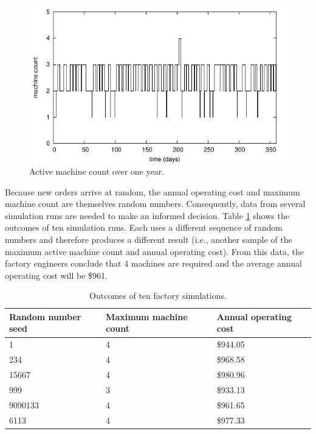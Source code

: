 \begin{figure}[ht]
\centering
\includegraphics{var_struct_models_figs/machine_plot.pdf}
\caption{Active machine count over one year.}
\label{fig:active_machine_plot}
\end{figure}
Because new orders arrive at random, the annual operating cost and maximum machine count are themselves random numbers. Consequently, data from several simulation runs are needed to make an informed decision. Table \ref{tab:monte_carlo_outcome} shows the outcomes of ten simulation runs. Each uses a different sequence of random numbers and therefore produces a different result (i.e., another sample of the maximum active machine count and annual operating cost). From this data, the factory engineers conclude that 4 machines are required and the average annual operating cost will be \$961.
\begin{table}[ht]
\centering
\begin{tabular}{|l|l|l|}
\hline
Random number seed & Maximum machine count & Annual operating cost \\ \hline
1 & 4 & \$944.05 \\ \hline
234 & 4 & \$968.58 \\ \hline
15667 & 4 & \$980.96 \\ \hline
999 & 3 & \$933.13 \\ \hline
9090133 & 4 & \$961.65 \\ \hline
6113 & 4 & \$977.33 \\ \hline
\end{tabular}
\caption{Outcomes of ten factory simulations.}
\label{tab:monte_carlo_outcome}
\end{table}

